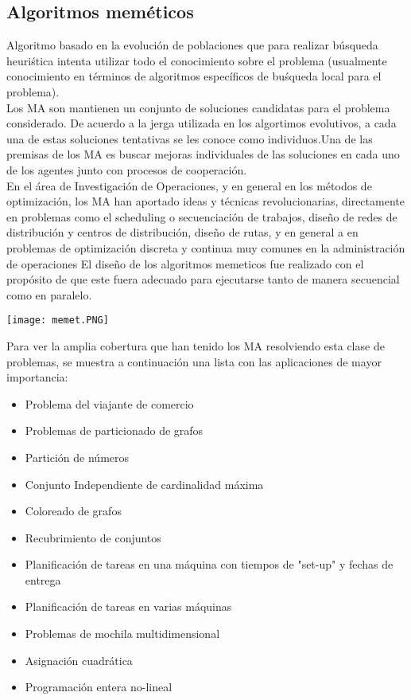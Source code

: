 \documentclass{article}
\begin{document}
\subsection{Algoritmos meméticos}
Algoritmo basado en la evoluci\'on de poblaciones que para realizar búsqueda heuri\'stica intenta utilizar todo el conocimiento sobre el problema (usualmente conocimiento en t\'erminos de algoritmos específicos de bu\'squeda local para el
problema).\\

Los MA son  mantienen un conjunto de soluciones candidatas para el problema considerado. De acuerdo a la jerga utilizada en los algortimos evolutivos, a cada una de estas soluciones tentativas se les conoce como individuos.Una de las premisas de los MA es buscar mejoras individuales de las soluciones en cada uno de los agentes junto con procesos de cooperación.\\

En el área de Investigación de Operaciones, y en general en los métodos de optimizaci\'on, los MA han aportado ideas y t\'ecnicas revolucionarias, directamente en problemas como el scheduling o secuenciación de trabajos, diseño de redes de distribución y centros de distribución, diseño de rutas, y en general a en problemas de optimizaci\'on discreta y continua muy comunes en la administraci\'on de operaciones
El diseño de los algoritmos memeticos fue realizado con el propósito de que este fuera adecuado para ejecutarse tanto de manera secuencial como en paralelo.

\begin{center}
    \texttt{[image: memet.PNG]}
\end{center}

Para ver la amplia cobertura que han tenido los MA resolviendo esta clase de problemas, se muestra a continuación una lista con las aplicaciones de mayor importancia:
\begin{itemize}
    \item Problema del viajante de comercio
    \item Problemas de particionado de grafos
    \item Partición de números
    \item Conjunto Independiente de cardinalidad máxima
    \item Coloreado de grafos
    \item Recubrimiento de conjuntos
    \item Planificación de tareas en una máquina con tiempos de "set-up" y fechas de entrega
    \item Planificación de tareas en varias máquinas
    \item Problemas de mochila multidimensional
    \item Asignación cuadrática
    \item Programación entera no-lineal
\end{itemize}
\end{document}
